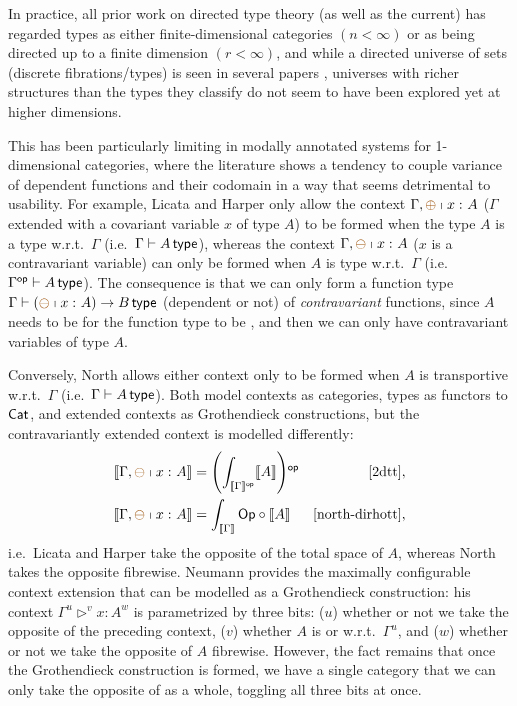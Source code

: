 \documentclass{lmcs} %
\theoremstyle{plain}\newtheorem{satz}[thm]{Satz} %
\theoremstyle{plain}
\theoremstyle{definition}
\begin{document}
In practice, all prior work on directed type theory (as well as the current) has regarded types as either finite-dimensional categories $(n < \infty)$ or as being directed up to a finite dimension $(r < \infty)$,
and while a directed universe of sets (discrete fibrations/types) is seen in several papers \cite{2dtt,riehl-shulman-dtt,weaver-licata-dua,dua-simplicial},
universes with richer structures than the types they classify do not seem to have been explored yet at higher dimensions.

This has been particularly limiting in modally annotated systems for 1-dimensional categories, where the literature shows a tendency to couple variance of dependent functions and their codomain in a way that seems detrimental to usability.
For example, Licata and Harper \cite{2dtt} only allow the context $\Gamma, \ctxmodnovar{{\oplus}}{x}{A}$ ($\Gamma$ extended with a covariant variable $x$ of type $A$) to be formed when the type $A$ is a \covarfib{} type w.r.t.\ $\Gamma$ (i.e.\ $\Gamma \vdash A \,\mathsf{type}$), whereas the context $\Gamma, \ctxmodnovar{{\ominus}}{x}{A}$ ($x$ is a contravariant variable) can only be formed when $A$ is \acontravarfib{} type w.r.t.\ $\Gamma$ (i.e.\ $\Gamma^{\mathsf{op}} \vdash A \,\mathsf{type}$).
The consequence is that we can only form a \covarfib{} function type $\Gamma \sez (\ctxmodnovar{{\ominus}}{x}{A}) \to B \type$ (dependent or not) of \emph{contravariant} functions, since $A$ needs to be \contravarfib{} for the function type to be \covarfib{}, and then we can only have contravariant variables of type $A$.

Conversely, North \cite{north-dirhott} allows either context only to be formed when $A$ is transportive w.r.t.\ $\Gamma$ (i.e.\ $\Gamma \vdash A \,\mathsf{type}$).
Both model contexts as categories, types as functors to ${\mathsf{Cat}}$, and extended contexts as Grothendieck constructions, but the contravariantly extended context is modelled differently:
\begin{align*}
	\interp{\Gamma, \ctxmodnovar{{\ominus}}{x}{A}} &= 
	\paren{ \int_{\interp{\Gamma}\op} \interp{A} }\op & \text{\cite{2dtt}}, \\
	\interp{\Gamma, \ctxmodnovar{{\ominus}}{x}{A}} &= \int_{\interp{\Gamma}} \Op \circ \interp{A} & \text{\cite{north-dirhott}},
\end{align*}
i.e.\ Licata and Harper take the opposite of the total space of $A$, whereas North takes the opposite fibrewise.
Neumann \cite{neumann-modal-sogats} provides the maximally configurable context extension that can be modelled as a Grothendieck construction: his context $\Gamma^u \rhd^v x : A^w$ is parametrized by three bits: ($u$) whether or not we take the opposite of the preceding context, ($v$) whether $A$ is \covarfib{} or \contravarfib{} w.r.t.\ $\Gamma^u$, and ($w$) whether or not we take the opposite of $A$ fibrewise.
However, the fact remains that once the Grothendieck construction is formed, we have a single category that we can only take the opposite of as a whole, toggling all three bits at once.
\end{document}
